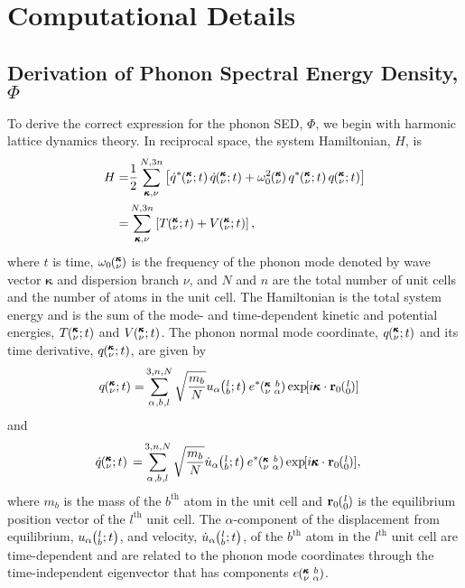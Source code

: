 \chapter{\label{Appendix_A}Computational Details}

\section{\label{Appendix_A:Derivation}
Derivation of Phonon Spectral Energy Density, $\Phi$}

To derive the correct expression for the phonon SED, $\Phi$, we begin 
with harmonic lattice dynamics theory.\cite{wallace_thermodynamics_1972,
dove_introduction_1993} In reciprocal space, the system Hamiltonian, 
$H$, is
\begin{equation}\label{E:H_HLD}
\begin{split}
H=&\frac{1}{2}\SUM{}{}\left[\dot{q}^*\kvt \dot{q}\kvt + \omega_0^2\kv 
q^*\kvt q\kvt\right]\\
 =&\SUM{}{}\left[T\kvt + V\kvt\right],
\end{split}
\end{equation}
where $t$ is time, $\omega_0\mspace{-4.0mu}\left(\mspace{-8.0mu} \begin{smallmatrix}&\pmb{\kappa} \\&\nu\end{smallmatrix} \mspace{-3.0mu}\right)$ is the frequency of the phonon mode 
denoted by
wave vector $\pmb{\kappa}$ and dispersion branch $\nu$, and $N$ and 
$n$ are
the total number of unit cells and the number of atoms in the unit cell.
The
Hamiltonian is the total system energy and is the sum of the mode- and
time-dependent kinetic and potential energies, $T\mspace{-4.0mu}\left(\mspace{-8.0mu} \begin{smallmatrix}&\pmb{\kappa} \\&\nu\end{smallmatrix} \mspace{-2.0mu};t\right)$ and $V\mspace{-4.0mu}\left(\mspace{-8.0mu} \begin{smallmatrix}&\pmb{\kappa} \\&\nu\end{smallmatrix} \mspace{-2.0mu};t\right)$.  The
phonon normal mode coordinate, $q\mspace{-4.0mu}\left(\mspace{-8.0mu} \begin{smallmatrix}&\pmb{\kappa} \\&\nu\end{smallmatrix} \mspace{-2.0mu};t\right)$ and its time derivative, 
$q\mspace{-4.0mu}\left(\mspace{-8.0mu} \begin{smallmatrix}&\pmb{\kappa} \\&\nu\end{smallmatrix} \mspace{-2.0mu};t\right)$, are given by
\begin{equation}\label{A:E:q_HLD}
\begin{split}
q\kvt=&\SUM{0}{}\sqrt{\frac{m_b}{N}}u_{\alpha}\lbt e^*\kvba
\EXP{i\pmb{\kappa}\cdot\mathbf{r}_0\ab{l}{0}}
\end{split}
\end{equation}
and
\begin{equation}\label{A:E:qdot_HLD}
\begin{split}
\dot{q}\kvt{}{}{}=&\SUM{0}{}\sqrt{\frac{m_b}{N}}\dot{u}_{\alpha}\lbt
e^*\kvba\EXP{i\pmb{\kappa}\cdot\mathbf{r}_0\ab{l}{0}},
\end{split}
\end{equation}
where $m_b$ is the mass of the $b^{\textrm{th}}$ atom in the unit 
cell and
$\mathbf{r}_0\ab{l}{0}$ is the equilibrium position vector of the
$l^{\textrm{th}}$ unit cell. The $\alpha$-component of the displacement 
from
equilibrium, $u_{\alpha}\mspace{-4.0mu}\left(\mspace{-8.0mu} \begin{smallmatrix}&l \\&b\end{smallmatrix}\mspace{-2.0mu};t\right)$, and velocity, $\dot{u}_{\alpha}\mspace{-4.0mu}\left(\mspace{-8.0mu} \begin{smallmatrix}&l \\&b\end{smallmatrix}\mspace{-2.0mu};t\right)$, 
of the
$b^{\textrm{th}}$ atom in the $l^{\textrm{th}}$ unit cell are 
time-dependent
and are related to the phonon mode coordinates through the 
time-independent
eigenvector that has components $e\mspace{-4.0mu}\left(\mspace{-8.0mu} \begin{smallmatrix} &\pmb{\kappa} &b \\ &\nu &\alpha\end{smallmatrix} \mspace{-3.0mu}\right)$. 

